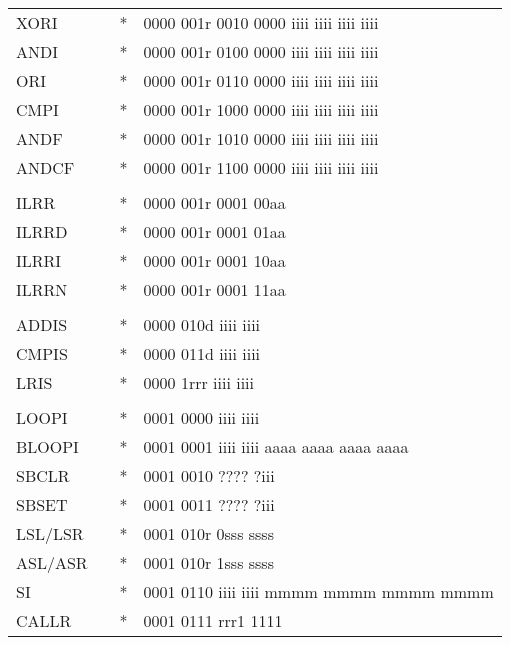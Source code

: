\documentclass[oneside,english,a4paper,10pt,oneside,openany,final]{memoir}
\begin{document}
\begin{center}
\begin{longtable}{TllT}
XORI        &          & *  & 0000 001r 0010 0000 iiii iiii iiii iiii \\
ANDI        &          & *  & 0000 001r 0100 0000 iiii iiii iiii iiii \\
ORI         &          & *  & 0000 001r 0110 0000 iiii iiii iiii iiii \\
CMPI        &          & *  & 0000 001r 1000 0000 iiii iiii iiii iiii \\
ANDF        &          & *  & 0000 001r 1010 0000 iiii iiii iiii iiii \\
ANDCF       &          & *  & 0000 001r 1100 0000 iiii iiii iiii iiii \\
            &          &    &                                         \\
ILRR        &          & *  & 0000 001r 0001 00aa                     \\
ILRRD       &          & *  & 0000 001r 0001 01aa                     \\
ILRRI       &          & *  & 0000 001r 0001 10aa                     \\
ILRRN       &          & *  & 0000 001r 0001 11aa                     \\
            &          &    &                                         \\
ADDIS       &          & *  & 0000 010d iiii iiii                     \\
CMPIS       &          & *  & 0000 011d iiii iiii                     \\
LRIS        &          & *  & 0000 1rrr iiii iiii                     \\
            &          &    &                                         \\
LOOPI       &          & *  & 0001 0000 iiii iiii                     \\
BLOOPI      &          & *  & 0001 0001 iiii iiii aaaa aaaa aaaa aaaa \\
SBCLR       &          & *  & 0001 0010 ???? ?iii                     \\
SBSET       &          & *  & 0001 0011 ???? ?iii                     \\
LSL/LSR     &          & *  & 0001 010r 0sss ssss                     \\
ASL/ASR     &          & *  & 0001 010r 1sss ssss                     \\
SI          &          & *  & 0001 0110 iiii iiii mmmm mmmm mmmm mmmm \\
CALLR       &          & *  & 0001 0111 rrr1 1111                     \\

\end{longtable}
\end{center}
\end{document}
